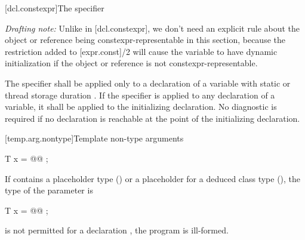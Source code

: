 \documentclass{wg21}
\begin{document}
[dcl.constexpr]{The  specifier}

\emph{Drafting note:} Unlike in [dcl.constexpr], we don't need an explicit rule
about the object or reference being constexpr-representable in this section,
because the restriction added to [expr.const]/2 will cause the variable to have
dynamic initialization if the object or reference is not
constexpr-representable.


The  specifier shall be applied only to a declaration of a
variable with static or thread storage duration . If the specifier is applied to
any declaration of a variable, it shall be applied to the initializing
declaration. No diagnostic is required if no  declaration is
reachable at the point of the initializing declaration.

[temp.arg.nontype]{Template non-type arguments}


\begin{addedblock}
\begin{codeblock}
    T x = @@ ;
\end{codeblock}
\end{addedblock}
%
If   
contains a placeholder type ()
or a placeholder for a deduced class type (),
the type of the parameter is 
\begin{removedblock}
\begin{codeblock}
    T x = @@ ;
\end{codeblock}
\end{removedblock}
 is not permitted
for a  declaration ,
the program is ill-formed.
\end{document}

